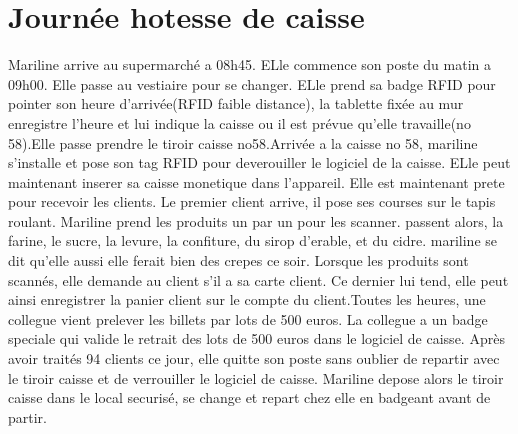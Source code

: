 \section{Journée hotesse de caisse}

Mariline arrive au supermarché a 08h45. ELle commence son poste du matin a 09h00. Elle passe au vestiaire pour se changer. ELle prend sa badge RFID pour pointer son heure d'arrivée(RFID faible distance), la tablette fixée au mur enregistre l'heure et lui indique la caisse ou il est prévue qu'elle travaille(no 58).Elle passe prendre le tiroir caisse no58.Arrivée a la caisse no 58, mariline s'installe et pose son tag RFID pour deverouiller le logiciel de la caisse. ELle peut maintenant inserer sa caisse monetique dans l'appareil. Elle est maintenant prete pour recevoir les clients. Le premier client arrive, il pose ses courses sur le tapis roulant. Mariline prend les produits un par un pour les scanner. passent alors, la farine, le sucre, la levure, la confiture, du sirop d'erable, et du cidre. mariline se dit qu'elle aussi elle ferait bien des crepes ce soir. Lorsque les produits sont scannés, elle demande au client s'il a sa carte client. Ce dernier lui tend, elle peut ainsi enregistrer la panier client sur le compte du client.Toutes les heures, une collegue vient prelever les billets par lots de 500 euros. La collegue a un badge speciale qui valide le retrait des lots de 500 euros dans le logiciel de caisse. Après avoir traités 94 clients ce jour, elle quitte son poste sans oublier de repartir avec le tiroir caisse et de verrouiller le logiciel de caisse. Mariline depose alors le tiroir caisse dans le local securisé, se change et repart chez elle en badgeant avant de partir.
